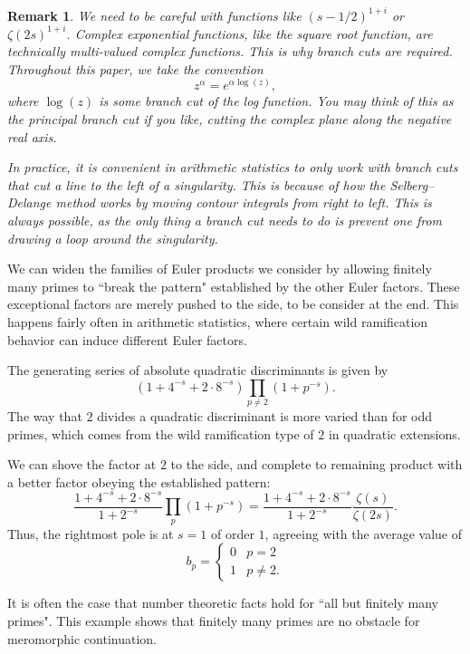 \documentclass[12pt]{amsart}
\newtheorem{remark}[theorem]{Remark}
\newenvironment{BOXexample}{
\begin{exbox}\mbox{}
\begin{example}
}
{
\end{example}
\end{exbox}
}
\theoremstyle{plain}
\begin{document}
\begin{remark}
    We need to be careful with functions like $(s-1/2)^{1+i}$ or $\zeta(2s)^{1+i}$. Complex exponential functions, like the square root function, are technically multi-valued complex functions. This is why branch cuts are required. Throughout this paper, we take the convention
    \[
    z^\alpha = e^{\alpha \log(z)},
    \]
    where $\log(z)$ is some branch cut of the log function. You may think of this as the principal branch cut if you like, cutting the complex plane along the negative real axis.

    In practice, it is convenient in arithmetic statistics to only work with branch cuts that cut a line to the left of a singularity. This is because of how the Selberg--Delange method works by moving contour integrals from right to left. This is always possible, as the only thing a branch cut needs to do is prevent one from drawing a loop around the singularity.
\end{remark}

We can widen the families of Euler products we consider by allowing finitely many primes to ``break the pattern" established by the other Euler factors. These exceptional factors are merely pushed to the side, to be consider at the end. This happens fairly often in arithmetic statistics, where certain wild ramification behavior can induce different Euler factors.

\begin{BOXexample}
The generating series of absolute quadratic discriminants is given by
\[
(1 + 4^{-s} + 2\cdot 8^{-s})\prod_{p\ne 2}(1 + p^{-s}).
\]
The way that $2$ divides a quadratic discriminant is more varied than for odd primes, which comes from the wild ramification type of $2$ in quadratic extensions.

We can shove the factor at $2$ to the side, and complete to remaining product with a better factor obeying the established pattern:
\[
\frac{1 + 4^{-s} + 2\cdot 8^{-s}}{1+2^{-s}}\prod_{p}(1 + p^{-s}) = \frac{1 + 4^{-s} + 2\cdot 8^{-s}}{1+2^{-s}}\frac{\zeta(s)}{\zeta(2s)}.
\]
Thus, the rightmost pole is at $s=1$ of order $1$, agreeing with the average value of
\[
b_p = \begin{cases}
0 & p=2\\
1 & p\ne 2.
\end{cases}
\]
\end{BOXexample}

It is often the case that number theoretic facts hold for ``all but finitely many primes". This example shows that finitely many primes are no obstacle for meromorphic continuation.
\end{document}
